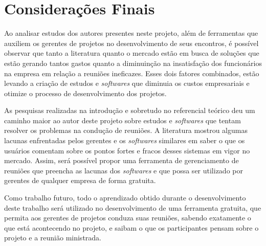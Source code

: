 \chapter{Considerações Finais}
\label{cp:consideracoes}

Ao analisar estudos dos autores presentes neste projeto, além de ferramentas que auxiliem os gerentes de projetos no desenvolvimento de seus encontros, é possível observar que tanto a literatura quanto o mercado estão em busca de soluções que estão gerando tantos gastos quanto a diminuinção na insatisfação dos funcionários na empresa em relação a reuniões ineficazes. Esses dois fatores combinados, estão levando a criação de estudos e \textit{softwares} que diminuia os custos empresariais e otimize o processo de desenvolvimento dos projetos.

As pesquisas realizadas na introdução e sobretudo no referencial teórico deu um caminho maior ao autor deste projeto sobre estudos e \textit{softwares} que tentam resolver os problemas na condução de reuniões. A literatura mostrou algumas lacunas enfrentadas pelos gerentes e os \textit{softwares} similares em saber o que os usuários comentam sobre os pontos fortes e fracos desses sistemas em vigor no mercado. Assim, será possível propor uma ferramenta de gerenciamento de reuniões que preencha as lacunas dos \textit{softwares} e que possa ser utilizado por gerentes de qualquer empresa de forma gratuita.

Como trabalho futuro, todo o aprendizado obtido durante o desenvolvimento deste trabalho será utilizado no desenvolvimento de uma ferramenta gratuita, que permita aos gerentes de projetos conduza suas reuniões, sabendo exatamente o que está acontecendo no projeto, e saibam o que os participantes pensam sobre o projeto e a reunião ministrada.